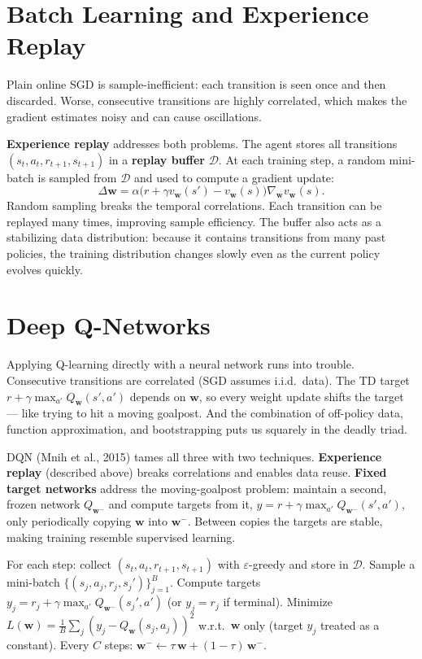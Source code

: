 \documentclass[11pt, oneside]{book}
\begin{document}
\section{Batch Learning and Experience Replay}

Plain online SGD is sample-inefficient: each transition is seen once and then
discarded.
Worse, consecutive transitions are highly correlated, which makes the gradient
estimates noisy and can cause oscillations.

\textbf{Experience replay} addresses both problems.
The agent stores all transitions $(s_t,a_t,r_{t+1},s_{t+1})$ in a
\textbf{replay buffer} $\mathcal{D}$.
At each training step, a random mini-batch is sampled from $\mathcal{D}$ and
used to compute a gradient update:
\[
  \Delta\mathbf{w} = \alpha\bigl(r + \gamma v_\mathbf{w}(s') - v_\mathbf{w}(s)\bigr)\nabla_\mathbf{w} v_\mathbf{w}(s).
\]
Random sampling breaks the temporal correlations.
Each transition can be replayed many times, improving sample efficiency.
The buffer also acts as a stabilizing data distribution: because it contains
transitions from many past policies, the training distribution changes slowly
even as the current policy evolves quickly.

\section{Deep Q-Networks}

Applying Q-learning directly with a neural network runs into trouble.
Consecutive transitions are correlated (SGD assumes i.i.d.\ data).
The TD target $r + \gamma\max_{a'}Q_\mathbf{w}(s',a')$ depends on $\mathbf{w}$,
so every weight update shifts the target --- like trying to hit a moving goalpost.
And the combination of off-policy data, function approximation, and bootstrapping
puts us squarely in the deadly triad.

DQN (Mnih et al., 2015) tames all three with two techniques.
\textbf{Experience replay} (described above) breaks correlations and enables
data reuse.
\textbf{Fixed target networks} address the moving-goalpost problem: maintain a
second, frozen network $Q_{\mathbf{w}^-}$ and compute targets from it,
$y = r + \gamma\max_{a'}Q_{\mathbf{w}^-}(s',a')$,
only periodically copying $\mathbf{w}$ into $\mathbf{w}^-$.
Between copies the targets are stable, making training resemble supervised learning.

\begin{thmbox}[title={DQN Training Loop}]
For each step: collect $(s_t,a_t,r_{t+1},s_{t+1})$ with $\varepsilon$-greedy
and store in $\mathcal{D}$.
Sample a mini-batch $\{(s_j,a_j,r_j,s_j')\}_{j=1}^B$.
Compute targets $y_j = r_j + \gamma\max_{a'}Q_{\mathbf{w}^-}(s_j',a')$
(or $y_j = r_j$ if terminal).
Minimize $L(\mathbf{w}) = \frac{1}{B}\sum_j (y_j - Q_\mathbf{w}(s_j,a_j))^2$
w.r.t.\ $\mathbf{w}$ only (target $y_j$ treated as a constant).
Every $C$ steps: $\mathbf{w}^- \leftarrow \tau\,\mathbf{w} + (1-\tau)\,\mathbf{w}^-$.
\end{thmbox}
\end{document}

